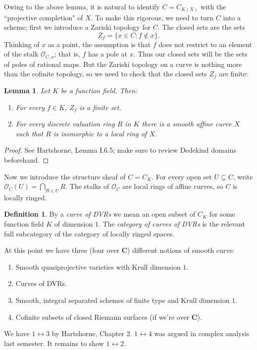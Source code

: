 \documentclass[reqno,12pt,letterpaper]{amsart}
\newcommand{\CC}{\mathbf{C}}
\newcommand{\dfn}[1]{\emph{#1}\index{#1}}
\newcommand{\Olo}{\mathscr O}
\newtheorem{lemma}[theorem]{Lemma}
\theoremstyle{definition}
\newtheorem{definition}[theorem]{Definition}
\begin{document}
Owing to the above lemma, it is natural to identify $C = C_{K(X)}$ with the ``projective completion" of $X$.
To make this rigorous, we need to turn $C$ into a scheme; first we introduce a Zariski topology for $C$.
The closed sets are the sets
$$Z_f = \{x \in C: f \notin x\}.$$
Thinking of $x$ as a point, the assumption is that $f$ does not restrict to an element of the stalk $\Olo_{C, x}$; that is, $f$ has a pole at $x$.
Thus our closed sets will be the sets of poles of rational maps.
But the Zariski topology on a curve is nothing more than the cofinite topology, so we need to check that the closed sets $Z_f$ are finite:

\begin{lemma}
Let $K$ be a function field.
Then:
\begin{enumerate}
\item For every $f \in K$, $Z_f$ is a finite set.
\item For every discrete valuation ring $R$ in $K$ there is a smooth affine curve $X$ such that $R$ is isomorphic to a local ring of $X$.
\end{enumerate}
\end{lemma}
\begin{proof}
See Hartshorne, Lemma I.6.5; make sure to review Dedekind domains beforehand.
\end{proof}

Now we introduce the structure sheaf of $C = C_K$.
For every open set $U \subseteq C$, write $\Olo_C(U) = \bigcap_{R \in U} R$.
The stalks of $\Olo_C$ are local rings of affine curves, so $C$ is locally ringed.

\begin{definition}
By a \dfn{curve of DVRs} we mean an open subset of $C_K$ for some function field $K$ of dimension $1$.
The \dfn{category of curves of DVRs} is the relevant full subcategory of the category of locally ringed spaces.
\end{definition}

At this point we have three (four over $\CC$) different notions of smooth curve:
\begin{enumerate}
\item Smooth quasiprojective varieties with Krull dimension $1$.
\item Curves of DVRs.
\item Smooth, integral separated schemes of finite type and Krull dimension $1$.
\item Cofinite subsets of closed Riemann surfaces (if we're over $\CC$).
\end{enumerate}
We have $1 \leftrightarrow 3$ by Hartshorne, Chapter 2.
$1 \leftrightarrow 4$ was argued in complex analysis last semester.
It remains to show $1 \leftrightarrow 2$.
\end{document}
